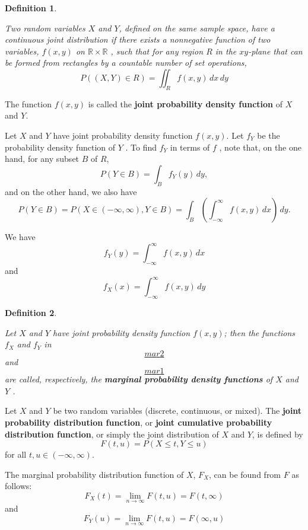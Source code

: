 \documentclass[
]{book}
\theoremstyle{definition}
\newtheorem{definition}{Definition}[chapter]
\theoremstyle{definition}
\theoremstyle{definition}
\theoremstyle{definition}
\theoremstyle{remark}
\begin{document}
\begin{definition}
\protect\hypertarget{def:unlabeled-div-17}{}\label{def:unlabeled-div-17}

\emph{Two random variables \(X\) and \(Y\), defined on the
same sample space, have a continuous joint distribution if there exists
a nonnegative function of two variables, \(f(x, y)\) on
\(\mathbb{R} \times \mathbb{R}\) , such that for any region \(R\) in the
\(xy\)-plane that can be formed from rectangles by a countable number of
set operations, \[P((X, Y)  \in R) = \iint_R f(x,y) \, dx\, dy\] }

\end{definition}

The function \(f (x, y)\) is called the \textbf{joint probability density
function} of \(X\) and \(Y\).

Let \(X\) and \(Y\) have joint probability density function \(f (x, y)\). Let
\(f_Y\) be the probability density function of \(Y\) . To find \(f_Y\) in
terms of \(f\) , note that, on the one hand, for any subset \(B\) of \(R\),
\[P(Y \in B) = \int_B f_Y(y) \, dy,\] and on the other hand, we also
have
\[P(Y \in B) = P(X \in (-\infty, \infty), Y \in B) = \int_B \left(    \int_{-\infty}^\infty f(x,y)\, dx  \right) \, dy.\]

We have \[\label{mar1}  f_Y(y) =   \int_{-\infty}^\infty f(x,y)\, dx\]
and \[\label{mar2}  f_X(x) =   \int_{-\infty}^\infty f(x,y)\, dy\]

\begin{definition}
\protect\hypertarget{def:unlabeled-div-18}{}\label{def:unlabeled-div-18}

\emph{Let \(X\) and \(Y\) have joint probability density
function \(f (x, y)\); then the functions \(f_X\) and \(f_Y\) in
\protect\hyperlink{mar2}{\[mar2\]} and
\protect\hyperlink{mar1}{\[mar1\]} are called,
respectively, the \textbf{marginal probability density functions} of \(X\) and
\(Y\) .}

\end{definition}

Let \(X\) and \(Y\) be two random variables (discrete, continuous, or
mixed). The \textbf{joint probability distribution function}, or \textbf{joint
cumulative probability distribution function}, or simply the joint
distribution of \(X\) and \(Y\), is defined by
\[F(t, u) = P(X \le t, Y \le u)\] for all \(t, u \in (-\infty, \infty)\).

The marginal probability distribution function of \(X\), \(F_X\), can be
found from \(F\) as follows:
\[F_X(t) = \lim_{n \rightarrow \infty} F(t,u)  = F(t, \infty)\] and
\[F_Y(u) = \lim_{n \rightarrow \infty}F(t,u)  = F( \infty, u)\]
\end{document}
